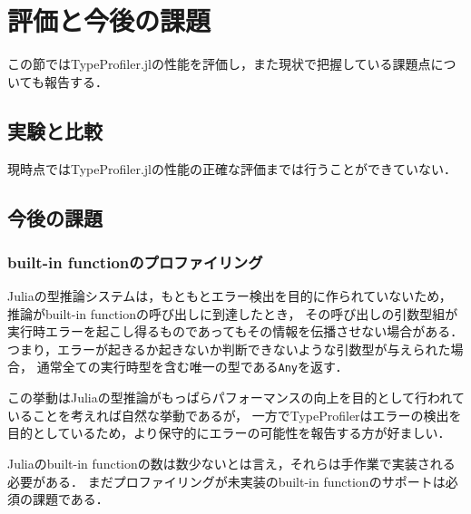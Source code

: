 
\section{評価と今後の課題} \label{section:4}

この節ではTypeProfiler.jlの性能を評価し，また現状で把握している課題点についても報告する．

\subsection{実験と比較}

現時点ではTypeProfiler.jlの性能の正確な評価までは行うことができていない．


\subsection{今後の課題}


\subsubsection{built-in functionのプロファイリング}

Juliaの型推論システムは，もともとエラー検出を目的に作られていないため，
推論がbuilt-in functionの呼び出しに到達したとき，
その呼び出しの引数型組が実行時エラーを起こし得るものであってもその情報を伝播させない場合がある．
つまり，エラーが起きるか起きないか判断できないような引数型が与えられた場合，
通常全ての実行時型を含む唯一の型である\verb|Any|を返す．

この挙動はJuliaの型推論がもっぱらパフォーマンスの向上を目的として行われていることを考えれば自然な挙動であるが，
一方でTypeProfilerはエラーの検出を目的としているため，より保守的にエラーの可能性を報告する方が好ましい．

Juliaのbuilt-in functionの数は数少ないとは言え，それらは手作業で実装される必要がある．
まだプロファイリングが未実装のbuilt-in functionのサポートは必須の課題である．

